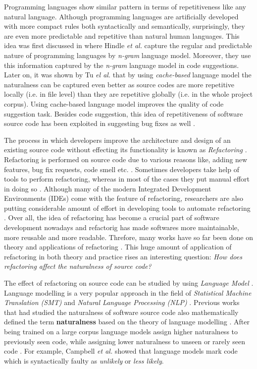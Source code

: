 \documentclass[conference]{IEEEtran}
\begin{document}
Programming languages show similar pattern in terms of repetitiveness like any natural language. Although programming languages are artificially developed with more compact rules both syntactically and semantically, surprisingly, they are even more predictable and repetitive than natural human languages. This idea was first discussed in \cite{Hindle} where Hindle \textit{et al.} capture the regular and predictable nature of programming languages by \textit{n-gram} language model. Moreover, they use this information captured by the \textit{n-gram} language model in code suggestions. Later on, it was shown by Tu \textit{el al.} \cite{Tu} that by using \textit{cache-based} language model the naturalness can be captured even better as source codes are more repetitive locally (i.e. in file level) than they are repetitive globally (i.e. in the whole project corpus). Using cache-based language model improves the quality of code suggestion task. Besides code suggestion, this idea of repetitiveness of software source code has been exploited in suggesting bug fixes as well \cite{Ray}.

The process in which developers improve the architecture and design of an existing source code without effecting its functionality is known as \textit{Refactoring} \cite{Opdyke}. Refactoring is performed on source code due to various reasons like, adding new features, bug fix requests, code smell etc. \cite{Silva}. Sometimes developers take help of tools to perform refactoring, whereas in most of the cases they put manual effort in doing so \cite{Murphy}\cite{Silva}. Although many of the modern Integrated Development Environments (IDEs) come with the feature of refactoring, researchers are also putting considerable amount of effort in developing tools to automate refactoring \cite{GailMurphy}\cite{Davood}. Over all, the idea of refactoring has become a crucial part of software development nowadays and refactorig has made softwares more maintainable, more reusable and more readable. Threfore, many works have so far been done on theory and applications of refactoring \cite{Zibran}\cite{Mondal}\cite{Fokaefs}\cite{Tsantalis}. This huge amount of application of refactoring in both theory and practice rises an interesting question: \textit{How does refactoring affect the naturalness of source code?}

The effect of refactoring on source code can be studied by using \textit{Language Model} \cite{Brown}. Language modelling is a very popular approach in the field of \textit{Statistical Machine Translation (SMT)} \cite{Koehn} and \textit{Natural Language Processing (NLP)} \cite{Jones}. Previous works that had studied the naturalness of software source code also mathematically defined the term \textbf{naturalness} based on the theory of language modelling \cite{Ray}\cite{Hindle}\cite{Tu}. After being trained on a large corpus language models assign higher naturalness to previously seen code, while assigning lower naturalness to unseen or rarely seen code \cite{Tu}. For example, Campbell \textit{et al.} \cite{Campbell} showed that language models mark code which is syntactically faulty as \textit{unlikely} or \textit{less likely}.
\end{document}
